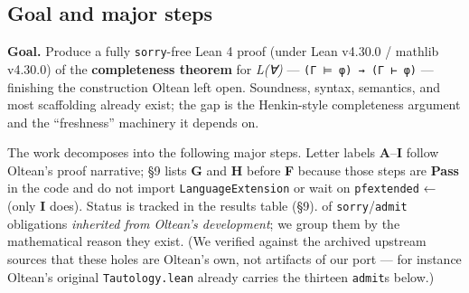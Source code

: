 \documentclass[11pt,a4paper]{article}
\renewcommand{\_}{\origtextunderscore\allowbreak}
\begin{document}
\hypertarget{goal-and-major-steps}{%
\subsection{Goal and major steps}\label{goal-and-major-steps}}

\textbf{Goal.} Produce a fully \texttt{sorry}-free Lean 4 proof (under Lean v4.30.0 / mathlib v4.30.0) of the \textbf{completeness theorem} for \emph{L(∀)} --- \texttt{(Γ\ ⊨\ φ)\ →\ (Γ\ ⊢\ φ)} --- finishing the construction Oltean left open. Soundness, syntax, semantics, and most scaffolding already exist; the gap is the Henkin-style completeness argument and the ``freshness'' machinery it depends on.

The work decomposes into the following major steps. Letter labels \textbf{A}--\textbf{I} follow Oltean's proof narrative; §9 lists \textbf{G} and \textbf{H} before \textbf{F} because those steps are \textbf{Pass} in the code and do not import \texttt{LanguageExtension} or wait on \texttt{pf\_extended} ← (only \textbf{I} does). Status is tracked in the results table (§9). of \texttt{sorry}/\texttt{admit} obligations \emph{inherited from Oltean's development}; we group them by the mathematical reason they exist. (We verified against the archived upstream sources that these holes are Oltean's own, not artifacts of our port --- for instance Oltean's original \texttt{Tautology.lean} already carries the thirteen \texttt{admit}s below.)
\end{document}
